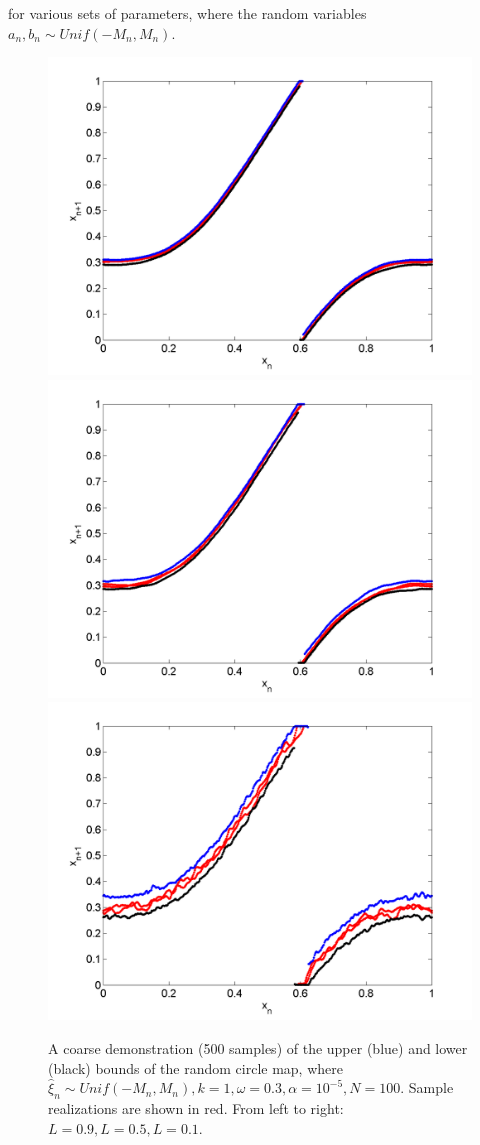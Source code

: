 for various sets of parameters, where the random variables
$a_n,b_n\sim Unif(-M_n,M_n)$. 
\begin{figure}[htp]
\caption[Upper and lower bounds on the random circle map, with a uniform
distribution, where $k=1,\omega=0.3$]{A coarse
  demonstration (500 samples) of the upper (blue) and lower (black)
  bounds of the random circle map, where $\hat{\xi}_n\sim
  Unif(-M_n,M_n),k=1,\omega=0.3,\alpha = 10^{-5},N=100$. Sample
  realizations are shown in red. From left to right: $L=0.9,L=0.5,L=0.1$.}\label{fig:circ_u_envelope1}
\centering
\includegraphics[width=.3\textwidth]{figs/envelope_unif_500_k1_L09_w03.png}\hfill
\includegraphics[width=.3\textwidth]{figs/envelope_unif_500_k1_L05_w03.png}\hfill
\includegraphics[width=.3\textwidth]{figs/envelope_unif_500_k1_L01_w03.png}
\end{figure}

